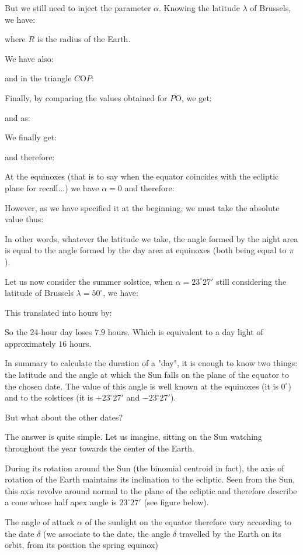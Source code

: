 	But we still need to inject the parameter $\alpha$. Knowing the latitude $\lambda$ of Brussels, we have:
	
	where $R$ is the radius of the Earth.

	We have also:
	
	and in the triangle $C\text{O}P$:
	
	Finally, by comparing the values obtained for $\overline{P\text{O}}$, we get:
	
	and as:
	
	We finally get:
	
	and therefore:
	
	At the equinoxes (that is to say when the equator coincides with the ecliptic plane for recall...) we have $\alpha=0$ and therefore:
	
	However, as we have specified it at the beginning, we must take the absolute value thus:
	
	In other words, whatever the latitude we take, the angle formed by the night area is equal to the angle formed by the day area at equinoxes (both being equal to $\pi$).

	Let us now consider the summer solstice, when $\alpha=23^\circ 27'$ still considering the latitude of Brussels $\lambda=50^\circ$, we have:
	
	This translated into hours by:
	
	So the 24-hour day loses $7.9$ hours. Which is equivalent to a day light of approximately $16$ hours.
	
	In summary to calculate the duration of a "day", it is enough to know two things: the latitude and the angle at which the Sun falls on the plane of the equator to the chosen date. The value of this angle is well known at the equinoxes (it is $0^\circ$) and to the solstices (it is $+23^\circ 27'$ and $-23^\circ 27'$).

	But what about the other dates?
	
	The answer is quite simple. Let us imagine, sitting on the Sun watching throughout the year towards the center of the Earth.

	During its rotation around the Sun (the binomial centroid in fact), the axis of rotation of the Earth maintains its inclination to the ecliptic. Seen from the Sun, this axis revolve around normal to the plane of the ecliptic and therefore describe a cone whose half apex angle is $23^\circ27'$ (see figure below).

	The angle of attack $\alpha$ of the sunlight on the equator therefore vary according to the date $\delta$ (we associate to the date, the angle $\delta$ travelled by the Earth on its orbit, from its position the spring equinox)

